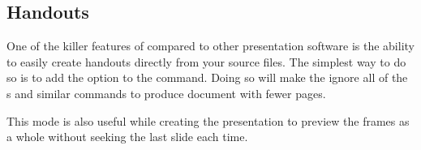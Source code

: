 \subsection{Handouts}

One of the killer features of  compared to other presentation
software is the ability to easily create handouts directly from your source
files. The simplest way to do so is to add the option  to the
 command. Doing so will make the  ignore all of
the s and similar commands to produce document with fewer pages.
This mode is also useful while creating the presentation to preview the frames
as a whole without seeking the last slide each time.

